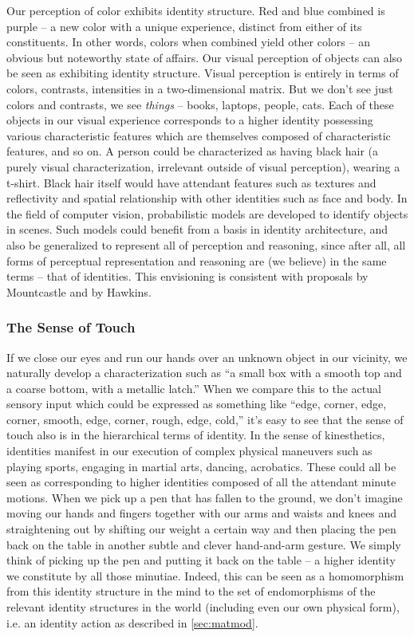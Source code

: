 \documentclass[pra,twocolumn,groupedaddress,10pt]{revtex4}
\theoremstyle{definition}
\begin{document}
Our perception of color exhibits identity structure. Red and blue combined is purple -- a new color with a unique experience, distinct from either of its constituents. In other words, colors when combined yield other colors -- an obvious but noteworthy state of affairs. Our visual perception of objects can also be seen as exhibiting identity structure. Visual perception is entirely in terms of colors, contrasts, intensities in a two-dimensional matrix. But we don't see just colors and contrasts, we see \textit{things} -- books, laptops, people, cats. Each of these objects in our visual experience corresponds to a higher identity possessing various characteristic features which are themselves composed of characteristic features, and so on. A person could be characterized as having black hair (a purely visual characterization, irrelevant outside of visual perception), wearing a t-shirt. Black hair itself would have attendant features such as textures and reflectivity and spatial relationship with other identities such as face and body. In the field of computer vision, probabilistic models are developed to identify objects in scenes. Such models could benefit from a basis in identity architecture, and also be generalized to represent all of perception and reasoning, since after all, all forms of perceptual representation and reasoning are (we believe) in the same terms -- that of identities. This envisioning is consistent with proposals by Mountcastle\cite{mountcastle} and by Hawkins\cite{hawkins}.

\subsubsection{The Sense of Touch} \label{sec:sentou}

If we close our eyes and run our hands over an unknown object in our vicinity, we naturally develop a characterization such as ``a small box with a smooth top and a coarse bottom, with a metallic latch.'' When we compare this to the actual sensory input which could be expressed as something like ``edge, corner, edge, corner, smooth, edge, corner, rough, edge, cold,'' it's easy to see that the sense of touch also is in the hierarchical terms of identity. In the sense of kinesthetics, identities manifest in our execution of complex physical maneuvers such as playing sports, engaging in martial arts, dancing, acrobatics. These could all be seen as corresponding to higher identities composed of all the attendant minute motions. When we pick up a pen that has fallen to the ground, we don't imagine moving our hands and fingers together with our arms and waists and knees and straightening out by shifting our weight a certain way and then placing the pen back on the table in another subtle and clever hand-and-arm gesture. We simply think of picking up the pen and putting it back on the table -- a higher identity we constitute by all those minutiae. Indeed, this can be seen as a homomorphism from this identity structure in the mind to the set of endomorphisms of the relevant identity structures in the world (including even our own physical form), i.e. an identity action as described in \autoref{sec:matmod}.
\end{document}
